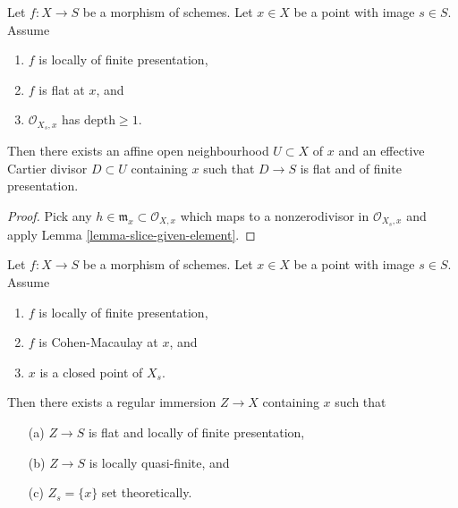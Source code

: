\begin{lemma}
\label{lemma-slice-once}
Let $f : X \to S$ be a morphism of schemes.
Let $x \in X$ be a point with image $s \in S$.
Assume
\begin{enumerate}
\item $f$ is locally of finite presentation,
\item $f$ is flat at $x$, and
\item $\mathcal{O}_{X_s, x}$ has $\text{depth} \geq 1$.
\end{enumerate}
Then there exists an affine open neighbourhood $U \subset X$ of $x$
and an effective Cartier divisor $D \subset U$ containing $x$ such that
$D \to S$ is flat and of finite presentation.
\end{lemma}

\begin{proof}
Pick any $h \in \mathfrak m_x \subset \mathcal{O}_{X, x}$ which
maps to a nonzerodivisor in $\mathcal{O}_{X_s, x}$ and apply
Lemma \ref{lemma-slice-given-element}.
\end{proof}

\begin{lemma}
\label{lemma-slice-CM}
Let $f : X \to S$ be a morphism of schemes.
Let $x \in X$ be a point with image $s \in S$.
Assume
\begin{enumerate}
\item $f$ is locally of finite presentation,
\item $f$ is Cohen-Macaulay at $x$, and
\item $x$ is a closed point of $X_s$.
\end{enumerate}
Then there exists a regular immersion $Z \to X$ containing $x$ such that
\begin{enumerate}
\item[(a)] $Z \to S$ is flat and locally of finite presentation,
\item[(b)] $Z \to S$ is locally quasi-finite, and
\item[(c)] $Z_s = \{x\}$ set theoretically.
\end{enumerate}
\end{lemma}

